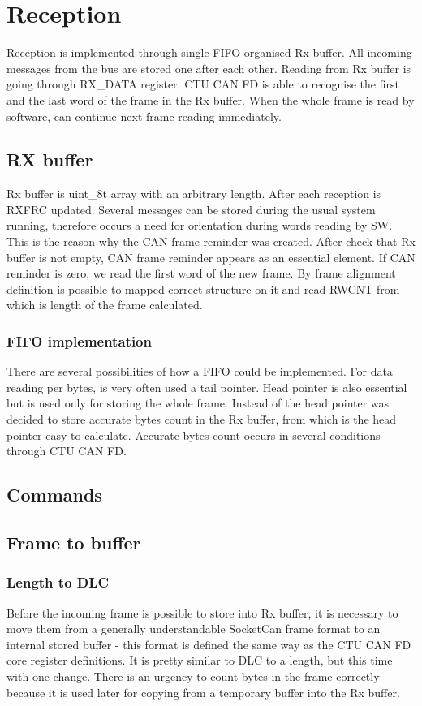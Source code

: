\documentclass{ctuthesis}
\begin{document}
 \section{Reception}
  Reception is implemented through single FIFO organised Rx buffer. All incoming messages from the bus are stored one after each other. Reading from Rx buffer is going through RX\_DATA register. CTU CAN FD is able to recognise the first and the last word of the frame in the Rx buffer. When the whole frame is read by software, can continue next frame reading immediately.

 \subsection{RX buffer}
  Rx buffer is uint\_8t array with an arbitrary length. After each reception is RXFRC updated. Several messages can be stored during the usual system running, therefore occurs a need for orientation during words reading by SW. This is the reason why the CAN frame reminder was created. After check that Rx buffer is not empty, CAN frame reminder appears as an essential element. If CAN reminder is zero, we read the first word of the new frame. By frame alignment definition is possible to mapped correct structure on it and read RWCNT from which is length of the frame calculated.
 
  \subsubsection{FIFO implementation}
   There are several possibilities of how a FIFO  could be implemented. For data reading per bytes, is very often used a tail pointer. Head pointer is also essential but is used only for storing the whole frame. Instead of the head pointer was decided to store accurate bytes count in the Rx buffer, from which is the head pointer easy to calculate. Accurate bytes count occurs in several conditions through CTU CAN FD.
 \subsection{Commands}
 
 \subsection{Frame to buffer}
 
  \subsubsection{Length to DLC}
   Before the incoming frame is possible to store into Rx buffer, it is necessary to move them from a generally understandable SocketCan frame format to an internal stored buffer - this format is defined the same way as the CTU CAN FD core register definitions. It is pretty similar to DLC to a length, but this time with one change. There is an urgency to count bytes in the frame correctly because it is used later for copying from a temporary buffer into the Rx buffer. 
  
\end{document}
